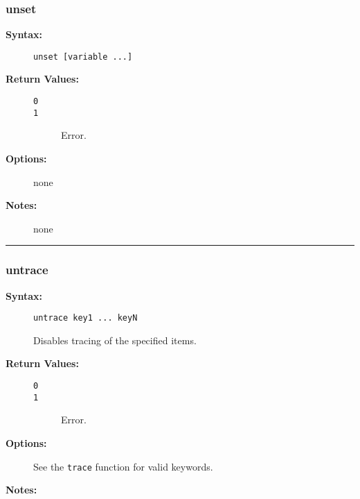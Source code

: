\subsubsection{unset}

\begin{description}
\item[{\bf Syntax:}] \mbox{}

{\tt unset [variable ...]}

\item[{\bf Return Values:}] \mbox{}

\begin{description}
\item[{\tt 0}] \mbox{}



\item[{\tt 1}] \mbox{}

Error.

\end{description}


\item[{\bf Options:}] \mbox{}

none  

\item[{\bf Notes:}] \mbox{}

none  

\end{description}


\hrule
\subsubsection{untrace}

\begin{description}
\item[{\bf Syntax:}] \mbox{}

{\tt untrace key1 ... keyN}

Disables tracing of the specified items. 

\item[{\bf Return Values:}] \mbox{}

\begin{description}
\item[{\tt 0}] \mbox{}



\item[{\tt 1}] \mbox{}

Error.

\end{description}


\item[{\bf Options:}] \mbox{}

See the {\tt trace} function for 
valid keywords. 

\item[{\bf Notes:}] \mbox{}

  

\end{description}


